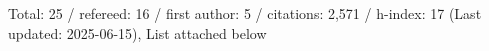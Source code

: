 Total: 25 / refereed: 16 / first author: 5 / citations: 2,571 / h-index: 17 (Last updated: 2025-06-15), List attached below